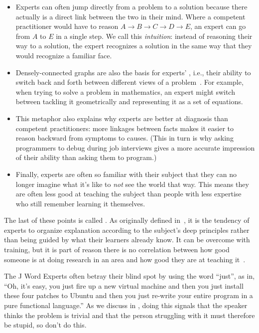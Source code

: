 \begin{itemize}

\item
  Experts can often jump directly from a problem to a solution
  because there actually is a direct link between the two in their mind.
  Where a competent practitioner would have to reason
  $A{\rightarrow}B{\rightarrow}C{\rightarrow}D{\rightarrow}E$,
  an expert can go from $A$ to $E$ in a single step.
  We call this \emph{intuition}:
  instead of reasoning their way to a solution,
  the expert recognizes a solution in the same way that they would recognize a familiar face.

\item
  Densely-connected graphs are also the basis for experts' ,
  i.e.,
  their ability to switch back and forth between different views of a problem~\cite{Petr2016}.
  For example,
  when trying to solve a problem in mathematics,
  an expert might switch between tackling it geometrically
  and representing it as a set of equations.

\item
  This metaphor also explains why experts are better at diagnosis than competent practitioners:
  more linkages between facts makes it easier to reason backward from symptoms to causes.
  (This in turn is why asking programmers to debug during job interviews
  gives a more accurate impression of their ability than asking them to program.)

\item
  Finally,
  experts are often so familiar with their subject that
  they can no longer imagine what it's like to \emph{not} see the world that way.
  This means they are often less good at teaching the subject than people with less expertise
  who still remember learning it themselves.

\end{itemize}

The last of these points is called .
As originally defined in~\cite{Nath2003},
it is the tendency of experts to organize explanation according to the subject's deep principles
rather than being guided by what their learners already know.
It can be overcome with training,
but it is part of reason there is no correlation between
how good someone is at doing research in an area
and how good they are at teaching it~\cite{Mars2002}.

\begin{aside}{The J Word}
  Experts often betray their blind spot by using the word ``just'',
  as in,
  ``Oh, it's easy, you just fire up a new virtual machine
  and then you just install these four patches to Ubuntu
  and then you just re-write your entire program in a pure functional language.''
  As we discuss in ,
  doing this signals that the speaker thinks the problem is trivial
  and that the person struggling with it must therefore be stupid,
  so don't do this.
\end{aside}

